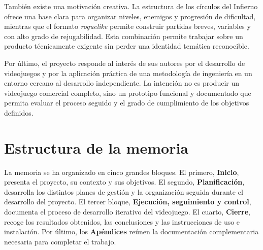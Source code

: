 También existe una motivación creativa. La estructura de los círculos del Infierno ofrece
una base clara para organizar niveles, enemigos y progresión de dificultad, mientras que
el formato \textit{roguelike} permite construir partidas breves, variables y con alto
grado de rejugabilidad. Esta combinación permite trabajar sobre un producto técnicamente
exigente sin perder una identidad temática reconocible.

Por último, el proyecto responde al interés de sus autores por el desarrollo de
videojuegos y por la aplicación práctica de una metodología de ingeniería en un entorno
cercano al desarrollo independiente. La intención no es producir un videojuego comercial
completo, sino un prototipo funcional y documentado que permita evaluar el proceso seguido
y el grado de cumplimiento de los objetivos definidos.

\section{Estructura de la memoria}
La memoria se ha organizado en cinco grandes bloques. El primero, \textbf{Inicio},
presenta el proyecto, su contexto y sus objetivos. El segundo,
\textbf{Planificación}, desarrolla los distintos planes de gestión y la
organización seguida durante el desarrollo del proyecto. El tercer bloque,
\textbf{Ejecución, seguimiento y control}, documenta el proceso de desarrollo
iterativo del videojuego. El cuarto, \textbf{Cierre}, recoge los resultados
obtenidos, las conclusiones y las instrucciones de uso e instalación. Por
último, los \textbf{Apéndices} reúnen la documentación complementaria necesaria
para completar el trabajo.
